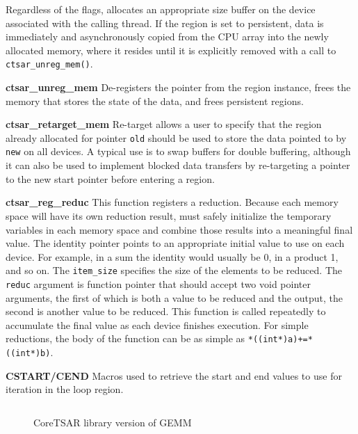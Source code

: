 Regardless of the flags, \tsar allocates an appropriate size buffer on the
device associated with the calling thread. If the region is set to persistent,
data is immediately and asynchronously copied from the CPU array into the newly
allocated memory, where it resides until it is explicitly removed with a call to
\verb#ctsar_unreg_mem()#.

\textbf{ctsar\_unreg\_mem} De-registers the pointer from the region instance,
frees the memory that stores the state of the data, and frees persistent
regions.

\textbf{ctsar\_retarget\_mem} Re-target allows a user to specify that the
region already allocated for pointer \verb#old# should be used to store the
data pointed to by \verb#new# on all devices.  A typical use is to swap
buffers for double buffering, although it can also be used to implement
blocked data transfers by re-targeting a pointer to the new start pointer
before entering a region.

\textbf{ctsar\_reg\_reduc} This function registers a reduction. Because each
memory space will have its own reduction result, \tsar must safely initialize
the temporary variables in each memory space and combine those results into a
meaningful final value. The identity pointer points to an appropriate initial
value to use on each device. For example, in a sum the identity would usually
be 0, in a product 1, and so on.  The \verb#item_size# specifies the size of
the elements to be reduced.  The \verb#reduc# argument is function pointer
that should accept two void pointer arguments, the first of which is both a
value to be reduced and the output, the second is another value to be reduced.
This function is called repeatedly to accumulate the final value as each
device finishes execution.  For simple reductions, the body of the function
can be as simple as \verb#*((int*)a)+=*((int*)b)#.

\textbf{CSTART/CEND} Macros used to retrieve the start and end values to use
for iteration in the loop region.





\begin{figure}[t]
    \begin{center}
        \ifm
        \inputminted[fontsize=\scriptsize,frame=single]{c}{snippets/manual.c}
        \else
        
        \fi

    \end{center}
    \caption{CoreTSAR library version of GEMM}
    \label{fig:k-means-split}
\end{figure}

